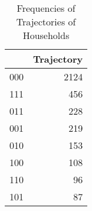 \begin{table}
\centering
\caption{Frequencies of Trajectories of Households}
\label{tbl:Trajectories}
\begin{tabular}{lr}
\toprule
{} &  Trajectory \\
\midrule
000 &        2124 \\
111 &         456 \\
011 &         228 \\
001 &         219 \\
010 &         153 \\
100 &         108 \\
110 &          96 \\
101 &          87 \\
\bottomrule
\end{tabular}
\end{table}
